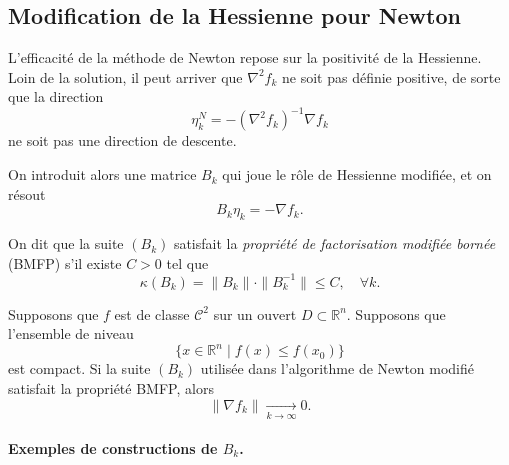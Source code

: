 \subsection{Modification de la Hessienne pour Newton}
\label{subsec:2.4.6}

L’efficacité de la méthode de Newton repose sur la positivi\-té de la Hessienne.
Loin de la solution, il peut arriver que $\nabla^2 f_k$ ne soit pas définie positive,
de sorte que la direction
\[
    \eta_k^N = -(\nabla^2 f_k)^{-1}\nabla f_k
\]
ne soit pas une direction de descente.

On introduit alors une matrice $B_k$ qui joue le rôle de Hessienne modifiée,
et on résout
\[
    B_k \eta_k = -\nabla f_k.
\]

\begin{algorithm}[H]
\caption{Newton avec recherche linéaire et Hessienne modifiée}
\label{alg:newton-modified}
\end{algorithm}

\begin{definition}
On dit que la suite $(B_k)$ satisfait la \emph{propriété de factorisation modifiée
bornée} (BMFP) s’il existe $C>0$ tel que
\[
    \kappa(B_k)
    = \|B_k\|\cdot\|B_k^{-1}\| \le C,
    \quad \forall k.
\]
\end{definition}

\begin{theoreme}
\label{thm:More-Sorensen}
Supposons que $f$ est de classe $\mathcal{C}^2$ sur un ouvert $D\subset\mathbb{R}^n$.
Supposons que l’ensemble de niveau
\[
    \{ x \in \mathbb{R}^n \;|\; f(x) \le f(x_0)\}
\]
est compact. Si la suite $(B_k)$ utilisée dans l’algorithme de Newton modifié
satisfait la propriété BMFP, alors
\[
    \|\nabla f_k\| \xrightarrow[k\to\infty]{} 0.
\]
\end{theoreme}

\paragraph{Exemples de constructions de $B_k$.}

